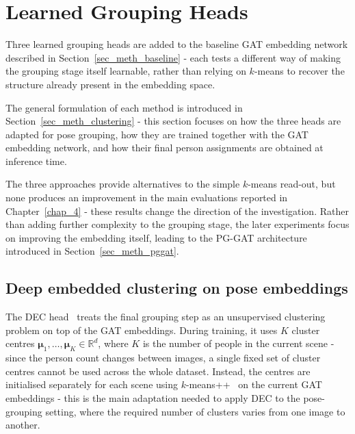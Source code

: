 \section{Learned Grouping Heads}
\label{sec_meth_learned_heads}

Three learned grouping heads are added to the baseline GAT embedding network
described in Section~\ref{sec_meth_baseline} -
each tests a different way of making the grouping stage itself learnable,
rather than relying on $k$-means to recover the structure already present in the embedding space.

The general formulation of each method is introduced in Section~\ref{sec_meth_clustering} -
this section focuses on how the three heads are adapted for pose grouping,
how they are trained together with the GAT embedding network,
and how their final person assignments are obtained at inference time.

The three approaches provide alternatives to the simple $k$-means read-out,
but none produces an improvement in the main evaluations reported in Chapter~\ref{chap_4} -
these results change the direction of the investigation.
Rather than adding further complexity to the grouping stage,
the later experiments focus on improving the embedding itself,
leading to the PG-GAT architecture introduced in Section~\ref{sec_meth_pggat}.

\subsection{Deep embedded clustering on pose embeddings}
\label{sec_meth_dec_pose}

The DEC head~\cite{xie2016dec} treats the final grouping step
as an unsupervised clustering problem on top of the GAT embeddings.
During training,
it uses $K$ cluster centres $\boldsymbol{\mu}_1, \dots, \boldsymbol{\mu}_K \in \mathbb{R}^{d}$,
where $K$ is the number of people in the current scene -
since the person count changes between images,
a single fixed set of cluster centres cannot be used across the whole dataset.
Instead,
the centres are initialised separately for each scene
using $k$-means++~\cite{arthur2007kmeanspp} on the current GAT embeddings -
this is the main adaptation needed to apply DEC to the pose-grouping setting,
where the required number of clusters varies from one image to another.

